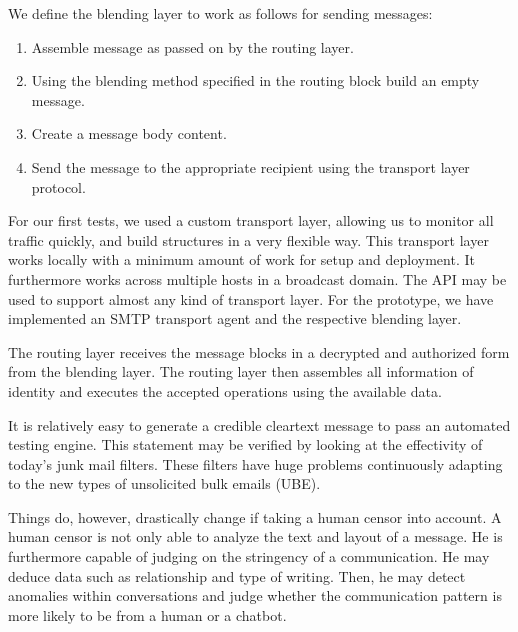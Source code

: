 \documentclass[10pt,journal,compsoc,twocolumn,twoside]{IEEEtran}
\begin{document}
We define the blending layer to work as follows for sending messages:
\begin{enumerate}
	\item Assemble message as passed on by the routing layer.
	\item Using the blending method specified in the routing block build an empty message. 
	\item Create a message body content.
	\item Send the message to the appropriate recipient using the transport layer protocol.
\end{enumerate}

For our first tests, we used a custom transport layer, allowing us to monitor all traffic quickly, and build structures in a very flexible way. This transport layer works locally with a minimum amount of work for setup and deployment. It furthermore works across multiple hosts in a broadcast domain. The API may be used to support almost any kind of transport layer. %
For the prototype, we have implemented an SMTP transport agent and the respective blending layer.

The routing layer receives the message blocks in a decrypted and authorized form from the blending layer. The routing layer then assembles all information of identity and executes the accepted operations using the available data. 

It is relatively easy to generate a credible cleartext message to pass an automated testing engine. This statement may be verified by looking at the effectivity of today's junk mail filters. These filters have huge problems continuously adapting to the new types of unsolicited bulk emails (UBE).

Things do, however, drastically change if taking a human censor into account. A human censor is not only able to analyze the text and layout of a message. He is furthermore capable of judging on the stringency of a communication. He may deduce data such as relationship and type of writing. Then, he may detect anomalies within conversations and judge whether the communication pattern is more likely to be from a human or a chatbot.
\end{document}
